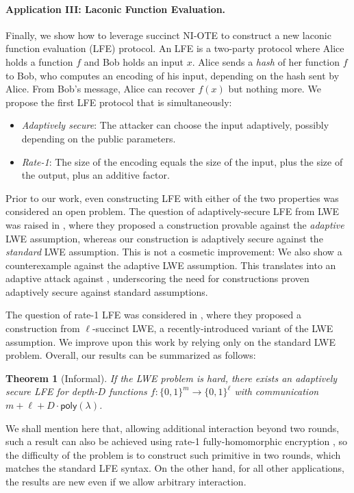 \documentclass{article}
\newtheorem{theorem}{Theorem}\newtheorem{lemma}[theorem]{Lemma}\newtheorem{proposition}[theorem]{Proposition}\newtheorem{corollary}[theorem]{Corollary}\newtheorem{definition}[theorem]{Definition}\newtheorem{claim}[theorem]{Claim}
\newcommand{\poly}{\mathsf{poly}}
\renewcommand{\sec}{\ensuremath{\lambda}}
\begin{document}
\paragraph{Application III: Laconic Function Evaluation.}
Finally, we show how to leverage succinct NI-OTE to construct a new laconic function evaluation (LFE) \cite{FOCS:QuaWeeWic18} protocol. {An LFE is a two-party protocol where Alice holds a function $f$ and Bob holds an input $x$. Alice sends a \emph{hash} of her function $f$ to Bob, who computes an encoding of his input, depending on the hash sent by Alice. From Bob's message, Alice can recover $f(x)$ but nothing more. We propose the first LFE protocol that is} simultaneously:
\begin{itemize}
    \item \emph{Adaptively secure}: The attacker can choose the input adaptively, possibly depending on the public parameters.
    \item \emph{Rate-1}: The size of the encoding equals the size of the input, plus the size of the output, plus an additive factor.
\end{itemize}
Prior to our work, even constructing LFE with either of the two properties was considered an open problem. 
The question of adaptively-secure LFE from LWE was raised in \cite{FOCS:QuaWeeWic18}, where they proposed a construction provable against the \emph{adaptive} LWE assumption, whereas our construction is adaptively secure against the \emph{standard} LWE assumption. {This is not a cosmetic improvement: We also show a counterexample against the adaptive LWE assumption. This translates into an adaptive attack against \cite{FOCS:QuaWeeWic18}, underscoring the need for constructions proven adaptively secure against standard assumptions.}

The question of rate-1 LFE was considered in \cite{C:Wee24}, where they proposed a construction from $\ell$-succinct LWE, a recently-introduced variant of the LWE assumption. We improve upon this work by relying only on the standard LWE problem. Overall, our results can be summarized as follows:
\begin{theorem}[Informal]
     If the LWE problem is hard, there exists an adaptively secure LFE for depth-$D$ functions $f:\{0, 1\}^m\rightarrow\{0, 1\}^\ell$ with communication $m+\ell+ D\cdot \poly(\sec)$.
\end{theorem}
{We shall mention here that, allowing additional interaction beyond two rounds, such a result can also be achieved using rate-1 fully-homomorphic encryption \cite{TCC:BDGM19}, so the difficulty of the problem is to construct such primitive in two rounds, which matches the standard LFE syntax. On the other hand, for all other applications, the results are new even if we allow arbitrary interaction.}
\end{document}
